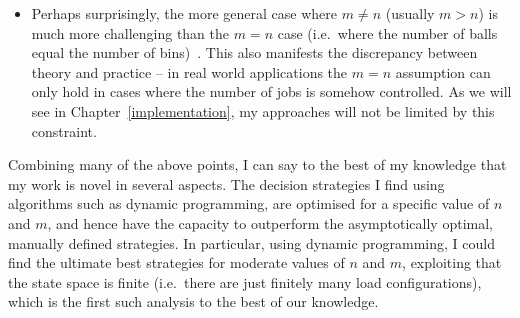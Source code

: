 \begin{itemize}
    \item
    Perhaps surprisingly, the more general case where $m\neq n$ (usually $m>n$) is much more challenging than the $m=n$ case (i.e.\ where the number of balls equal the number of bins)~\cite{berenbrink2006heavilyloaded}. This also manifests the discrepancy between theory and practice -- in real world applications the $m=n$ assumption can only hold in cases where the number of jobs is somehow controlled. As we will see in Chapter~\ref{implementation}, my approaches will not be limited by this constraint.

\end{itemize}

Combining many of the above points, I can say to the best of my knowledge that my work is novel in several aspects. The decision strategies I find using algorithms such as dynamic programming, are optimised for a specific value of $n$ and $m$, and hence have the capacity to outperform the asymptotically optimal, manually defined strategies. In particular, using dynamic programming, I could find the ultimate best strategies for moderate values of $n$ and $m$, exploiting that the state space is finite (i.e.\ there are just finitely many load configurations), which is the first such analysis to the best of our knowledge.


